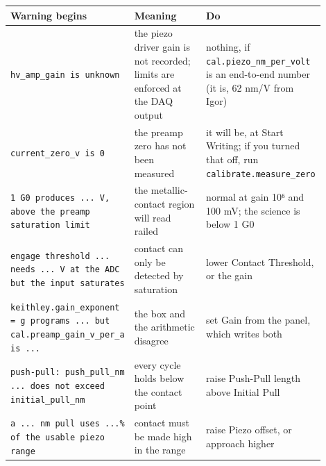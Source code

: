 \small\setlength{\LTleft}{0pt}\setlength{\LTright}{\fill}
\begin{longtable}{@{}>{\raggedright\arraybackslash}p{0.26\linewidth}>{\raggedright\arraybackslash}p{0.30\linewidth}>{\raggedright\arraybackslash}p{0.34\linewidth}@{}}
\toprule
\textbf{Warning begins} & \textbf{Meaning} & \textbf{Do} \\
\midrule\endhead
\texttt{hv\_\discretionary{}{}{}amp\_\discretionary{}{}{}gain is unknown} & the piezo driver gain is not recorded; limits are enforced at the DAQ output & nothing, if \texttt{cal.\discretionary{}{}{}piezo\_\discretionary{}{}{}nm\_\discretionary{}{}{}per\_\discretionary{}{}{}volt} is an end-to-end number (it is, 62 nm/V from Igor) \\
\texttt{current\_\discretionary{}{}{}zero\_\discretionary{}{}{}v is 0} & the preamp zero has not been measured & it will be, at Start Writing; if you turned that off, run \texttt{calibrate.\discretionary{}{}{}measure\_\discretionary{}{}{}zero} \\
\texttt{1 G0 produces .\discretionary{}{}{}.\discretionary{}{}{}.\discretionary{}{}{} V,\discretionary{}{}{} above the preamp saturation limit} & the metallic-contact region will read railed & normal at gain 10⁶ and 100 mV; the science is below 1 G0 \\
\texttt{engage threshold .\discretionary{}{}{}.\discretionary{}{}{}.\discretionary{}{}{} needs .\discretionary{}{}{}.\discretionary{}{}{}.\discretionary{}{}{} V at the ADC but the input saturates} & contact can only be detected by saturation & lower Contact Threshold, or the gain \\
\texttt{keithley.\discretionary{}{}{}gain\_\discretionary{}{}{}exponent = g programs .\discretionary{}{}{}.\discretionary{}{}{}.\discretionary{}{}{} but cal.\discretionary{}{}{}preamp\_\discretionary{}{}{}gain\_\discretionary{}{}{}v\_\discretionary{}{}{}per\_\discretionary{}{}{}a is .\discretionary{}{}{}.\discretionary{}{}{}.\discretionary{}{}{}} & the box and the arithmetic disagree & set Gain from the panel, which writes both \\
\texttt{push-pull: push\_\discretionary{}{}{}pull\_\discretionary{}{}{}nm .\discretionary{}{}{}.\discretionary{}{}{}.\discretionary{}{}{} does not exceed initial\_\discretionary{}{}{}pull\_\discretionary{}{}{}nm} & every cycle holds below the contact point & raise Push-Pull length above Initial Pull \\
\texttt{a .\discretionary{}{}{}.\discretionary{}{}{}.\discretionary{}{}{} nm pull uses .\discretionary{}{}{}.\discretionary{}{}{}.\discretionary{}{}{}\% of the usable piezo range} & contact must be made high in the range & raise Piezo offset, or approach higher \\

\end{longtable}
